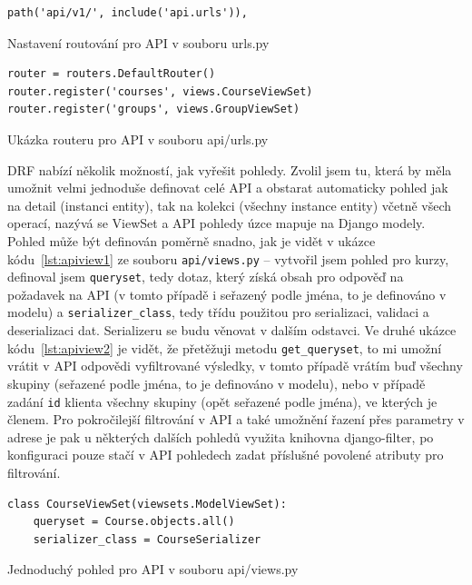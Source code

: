     \begin{listing}[ht]
    	\begin{verbatim}
path('api/v1/', include('api.urls')),
    	\end{verbatim}
    	\caption{Nastavení routování pro API v souboru urls.py}\label{lst:urls.py2}
    \end{listing}
    
    \begin{listing}[ht]
    	\begin{verbatim}
router = routers.DefaultRouter()
router.register('courses', views.CourseViewSet)
router.register('groups', views.GroupViewSet)
    	\end{verbatim}
    	\caption{Ukázka routeru pro API v souboru api/urls.py}\label{lst:apirouter}
    \end{listing}
    
    DRF nabízí několik možností, jak vyřešit pohledy. Zvolil jsem tu, která by měla umožnit velmi jednoduše definovat celé API a obstarat automaticky pohled jak na detail (instanci entity), tak na kolekci (všechny instance entity) včetně všech operací, nazývá se ViewSet a API pohledy úzce mapuje na Django modely. Pohled může být definován poměrně snadno, jak je vidět v ukázce kódu~\ref{lst:apiview1} ze souboru \verb|api/views.py| -- vytvořil jsem pohled pro kurzy, definoval jsem \verb|queryset|, tedy dotaz, který získá obsah pro odpověď na požadavek na API (v tomto případě i seřazený podle jména, to je definováno v modelu) a \verb|serializer_class|, tedy třídu použitou pro serializaci, validaci a deserializaci dat. Serializeru se budu věnovat v dalším odstavci. Ve druhé ukázce kódu~\ref{lst:apiview2} je vidět, že přetěžuji metodu \verb|get_queryset|, to mi umožní vrátit v API odpovědi vyfiltrované výsledky, v tomto případě vrátím buď všechny skupiny (seřazené podle jména, to je definováno v modelu), nebo v případě zadání \verb|id| klienta všechny skupiny (opět seřazené podle jména), ve kterých je členem. Pro pokročilejší filtrování v API a také umožnění řazení přes parametry v adrese je pak u některých dalších pohledů využita knihovna django-filter, po konfiguraci pouze stačí v API pohledech zadat příslušné povolené atributy pro filtrování.
    
    \begin{listing}[ht]
    	\begin{verbatim}
class CourseViewSet(viewsets.ModelViewSet):
    queryset = Course.objects.all()
    serializer_class = CourseSerializer
    	\end{verbatim}
    	\caption{Jednoduchý pohled pro API v souboru api/views.py}\label{lst:apiview1}
    \end{listing}
    
